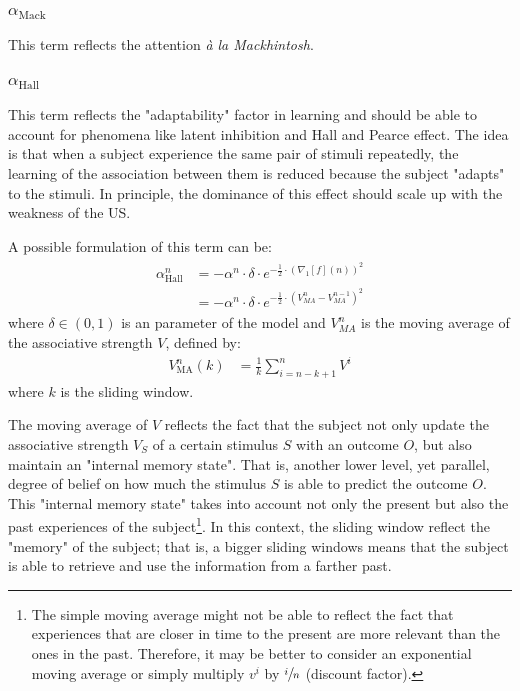\documentclass[11pt,a4paper]{article}
\newcommand{\alphamack}{\alpha _{\text{Mack}}}
\newcommand{\alphahall}{\alpha _{\text{Hall}}}
\begin{document}
\subsubsection{$\alphamack$}
This term reflects the attention \textit{à la Mackhintosh}.

\subsubsection{$\alphahall$}
This term reflects the "adaptability" factor in learning and should be able to account for phenomena like latent inhibition and Hall and Pearce effect. The idea is that when a subject experience the same pair of stimuli repeatedly, the learning of the association between them is reduced because the subject "adapts" to the stimuli. In principle, the dominance of this effect should scale up with the weakness of the US.  

A possible formulation of this term can be:
\begin{gather}
	\begin{aligned}
		\alphahall ^n &= - \alpha ^n \cdot \delta \cdot e^{- \frac{1}{2} \cdot 
		\displaystyle{ \left( \nabla_1 [ f ] ( n ) \right) ^2 }} \\
		&= - \alpha ^n \cdot \delta \cdot e ^ {- \frac{1}{2} \cdot \displaystyle{\left(V^n_{MA} - V^{n - 1}_{MA} \right) ^2}}
	\end{aligned}
\end{gather}
where $ \delta \in ( 0, 1 ) $ is an parameter of the model and $V^n_{MA}$ is the moving average of the associative strength $V$, defined by:
\begin{align}
    V ^n _{\text{MA}} (k) &= \frac{1}{k} \sum ^n _{i = n - k + 1} V ^i
\end{align}
where $k$ is the sliding window.

The moving average of $V$ reflects the fact that the subject not only update the associative strength $V_S$ of a certain stimulus $S$ with an outcome $O$, but also maintain an "internal memory state". That is, another lower level, yet parallel, degree of belief on how much the stimulus $S$ is able to predict the outcome $O$. This "internal memory state" takes into account not only the present but also the past experiences of the subject\footnote{The simple moving average might not be able to reflect the fact that experiences that are closer in time to the present are more relevant than the ones in the past. Therefore, it may be better to consider an exponential moving average or simply multiply $v^i$ by $\sfrac{i}{n}$ (discount factor).}. In this context, the sliding window reflect the "memory" of the subject; that is, a bigger sliding windows means that the subject is able to retrieve and use the information from a farther past.
\end{document}
